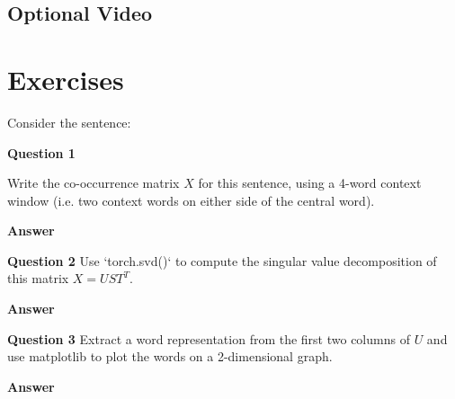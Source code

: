 \documentclass[11pt]{article}
\begin{document}
\subsection{Optional Video}\label{subsec:optional-video4}

\section{Exercises}\label{sec:exercises}
Consider the sentence:


\textbf{Question 1}

Write the co-occurrence matrix $X$ for this sentence, using a 4-word context window (i.e. two context words on either side of the central word).

\textbf{Answer}

\textbf{Question 2}
Use `torch.svd()` to compute the singular value decomposition of this matrix $X = UST^T$.

\textbf{Answer}

\textbf{Question 3}
Extract a word representation from the first two columns of $U$ and use matplotlib to plot the words on a 2-dimensional graph.

\textbf{Answer}
\end{document}
